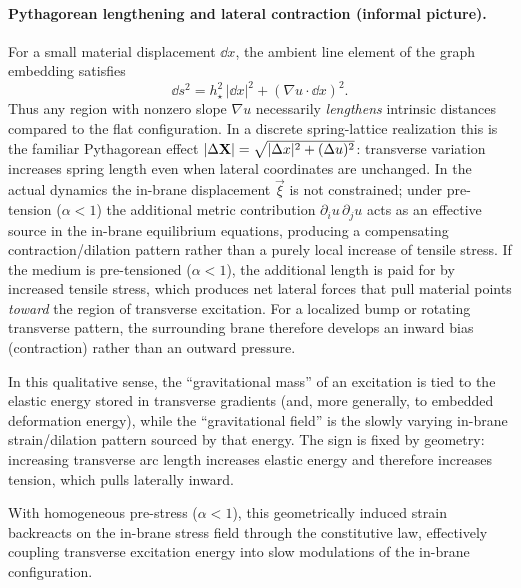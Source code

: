 \paragraph{Pythagorean lengthening and lateral contraction (informal picture).}
For a small material displacement $\dd x$, the ambient line element of the graph embedding satisfies
\begin{equation}
  \dd s^2 = h_\star^2\,|\dd x|^2 + (\nabla u\cdot \dd x)^2.
  \label{eq:line-element-graph}
\end{equation}
Thus any region with nonzero slope $\nabla u$ necessarily \emph{lengthens} intrinsic distances compared to the flat
configuration.
In a discrete spring-lattice realization this is the familiar Pythagorean effect
$|\Delta \mathbf{X}|=\sqrt{|\Delta x|^2+(\Delta u)^2}$: transverse variation increases spring length even when lateral
coordinates are unchanged.
In the actual dynamics the in-brane displacement $\vec\xi$ is not constrained; under pre-tension ($\alpha<1$) the
additional metric contribution $\partial_i u\,\partial_j u$ acts as an effective source in the in-brane equilibrium
equations, producing a compensating contraction/dilation pattern rather than a purely local increase of tensile stress.
If the medium is pre-tensioned ($\alpha<1$), the additional length is paid for by increased tensile stress,
which produces net lateral forces that pull material points \emph{toward} the region of transverse excitation.
For a localized bump or rotating transverse pattern, the surrounding brane therefore develops an inward bias
(contraction) rather than an outward pressure.

In this qualitative sense, the ``gravitational mass'' of an excitation is tied to the elastic energy stored in
transverse gradients (and, more generally, to embedded deformation energy), while the ``gravitational field'' is the
slowly varying in-brane strain/dilation pattern sourced by that energy.
The sign is fixed by geometry: increasing transverse arc length increases elastic energy and therefore increases
tension, which pulls laterally inward.

With homogeneous pre-stress ($\alpha<1$), this geometrically induced strain backreacts on the in-brane stress field
through the constitutive law, effectively coupling transverse excitation energy into slow modulations of the
in-brane configuration.

